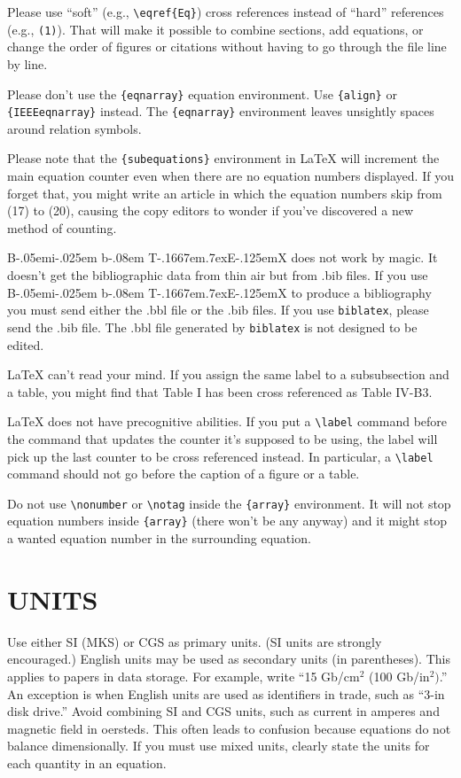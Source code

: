 \documentclass{ieeeojpel}
\def\BibTeX{{\rm B\kern-.05em{\sc i\kern-.025em b}\kern-.08em
    T\kern-.1667em\lower.7ex\hbox{E}\kern-.125emX}}
\begin{document}
Please use ``soft'' (e.g., \verb|\eqref{Eq}|) cross references instead
of ``hard'' references (e.g., \verb|(1)|). That will make it possible
to combine sections, add equations, or change the order of figures or
citations without having to go through the file line by line.

Please don't use the \verb|{eqnarray}| equation environment. Use
\verb|{align}| or \verb|{IEEEeqnarray}| instead. The \verb|{eqnarray}|
environment leaves unsightly spaces around relation symbols.

Please note that the \verb|{subequations}| environment in {\LaTeX}
will increment the main equation counter even when there are no
equation numbers displayed. If you forget that, you might write an
article in which the equation numbers skip from (17) to (20), causing
the copy editors to wonder if you've discovered a new method of
counting.

{\BibTeX} does not work by magic. It doesn't get the bibliographic
data from thin air but from .bib files. If you use {\BibTeX} to produce a
bibliography you must send either the .bbl file or the .bib files.
If you use \texttt{biblatex}, please send the .bib file. The .bbl file
generated by \texttt{biblatex} is not designed to be edited.

{\LaTeX} can't read your mind. If you assign the same label to a
subsubsection and a table, you might find that Table I has been cross
referenced as Table IV-B3.

{\LaTeX} does not have precognitive abilities. If you put a
\verb|\label| command before the command that updates the counter it's
supposed to be using, the label will pick up the last counter to be
cross referenced instead. In particular, a \verb|\label| command
should not go before the caption of a figure or a table.

Do not use \verb|\nonumber| or \verb|\notag| inside the \verb|{array}| environment. It
will not stop equation numbers inside \verb|{array}| (there won't be
any anyway) and it might stop a wanted equation number in the
surrounding equation.

\section{UNITS}
Use either SI (MKS) or CGS as primary units. (SI units are strongly 
encouraged.) English units may be used as secondary units (in parentheses). 
This applies to papers in data storage. For example, write ``15 Gb/cm$^{2}$ 
(100 Gb/in$^{2})$.'' An exception is when English units are used as 
identifiers in trade, such as ``3\textonehalf -in disk drive.'' Avoid 
combining SI and CGS units, such as current in amperes and magnetic field in 
oersteds. This often leads to confusion because equations do not balance 
dimensionally. If you must use mixed units, clearly state the units for each 
quantity in an equation.
\end{document}
